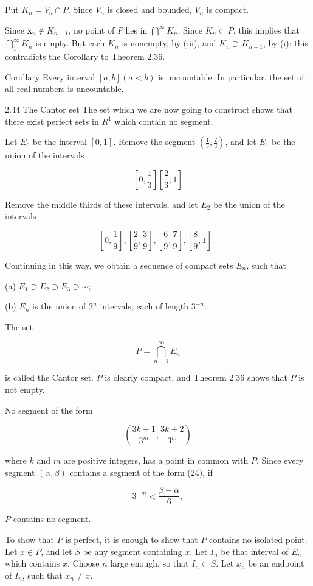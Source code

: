 \documentclass[10pt]{article}
\begin{document}
Put $K_{n}=\bar{V}_{n} \cap P$. Since $\bar{V}_{n}$ is closed and bounded, $\bar{V}_{n}$ is compact.

Since $\mathbf{x}_{n} \notin K_{n+1}$, no point of $P$ lies in $\bigcap_{1}^{\infty} K_{n}$. Since $K_{n} \subset P$, this implies that $\bigcap_{1}^{\infty} K_{n}$ is empty. But each $K_{n}$ is nonempty, by (iii), and $K_{n} \supset K_{n+1}$, by (i); this contradicts the Corollary to Theorem 2.36.

Corollary Every interval $[a, b](a<b)$ is uncountable. In particular, the set of all real numbers is uncountable.

2.44 The Cantor set The set which we are now going to construct shows that there exist perfect sets in $R^{1}$ which contain no segment.

Let $E_{0}$ be the interval $[0,1]$. Remove the segment $\left(\frac{1}{3}, \frac{2}{3}\right)$, and let $E_{1}$ be the union of the intervals

$$
\left[0, \frac{1}{3}\right]\left[\frac{2}{3}, 1\right]
$$

Remove the middle thirds of these intervals, and let $E_{2}$ be the union of the intervals

$$
\left[0, \frac{1}{9}\right],\left[\frac{2}{9}, \frac{3}{9}\right],\left[\frac{6}{9}, \frac{7}{9}\right],\left[\frac{8}{9}, 1\right] \text {. }
$$

Continuing in this way, we obtain a sequence of compact sets $E_{n}$, such that

(a) $E_{1} \supset E_{2} \supset E_{3} \supset \cdots$;

(b) $E_{n}$ is the union of $2^{n}$ intervals, each of length $3^{-n}$.

The set

$$
P=\bigcap_{n=1}^{\infty} E_{n}
$$

is called the Cantor set. $P$ is clearly compact, and Theorem 2.36 shows that $P$ is not empty.

No segment of the form

$$
\left(\frac{3 k+1}{3^{m}}, \frac{3 k+2}{3^{m}}\right)
$$

where $k$ and $m$ are positive integers, has a point in common with $P$. Since every segment $(\alpha, \beta)$ contains a segment of the form (24), if

$$
3^{-m}<\frac{\beta-\alpha}{6},
$$

$P$ contains no segment.

To show that $P$ is perfect, it is enough to show that $P$ contains no isolated point. Let $x \in P$, and let $S$ be any segment containing $x$. Let $I_{n}$ be that interval of $E_{n}$ which contains $x$. Choose $n$ large enough, so that $I_{n} \subset S$. Let $x_{n}$ be an endpoint of $I_{n}$, such that $x_{n} \neq x$.
\end{document}

